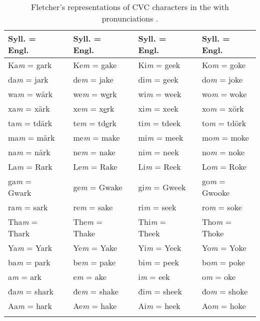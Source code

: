 \documentclass[output=paper]{LSP/langsci}
\begin{document}
\begin{table}
\begin{tabular}{lllllll}
\lsptoprule
Syll. = Engl. && Syll. = Engl. && Syll. = Engl. && Syll. = Engl.\\
\midrule
Ka\emph{m} = gark && Ke\emph{m} = gake && Ki\emph{m} = geek && Ko\emph{m} = goke\\
da\emph{m} = jark && de\emph{m} = jake && di\emph{m} = geek && do\emph{m} = joke\\
wa\emph{m} = wärk && we\emph{m} = w\underline{e}rk && wi\emph{m} = week && wo\emph{m} = woke\\
xa\emph{m} = xärk && xe\emph{m} = x\underline{e}rk && xi\emph{m} = xeek && xo\emph{m} = xörk\\
ta\emph{m} = tdärk && te\emph{m} = td\underline{e}rk && ti\emph{m} = tdeek && to\emph{m} = tdörk\\
ma\emph{m} = märk && me\emph{m} = make && mi\emph{m} = meek && mo\emph{m} = moke\\
na\emph{m} = närk && ne\emph{m} = nake && ni\emph{m} = neek && no\emph{m} = noke\\
La\emph{m} = Rark && Le\emph{m} = Rake && Li\emph{m} = Reek && Lo\emph{m} = Roke\\
ga\emph{m} = Gwark && ge\emph{m} = Gwake && gi\emph{m} = Gweek && go\emph{m} = Gwooke\\
ra\emph{m} = sark && re\emph{m} = sake && ri\emph{m} = seek && ro\emph{m} = soke\\
Tha\emph{m} = Thark && The\emph{m} = Thake && Thi\emph{m} = Theek && Tho\emph{m} = Thoke\\
Ya\emph{m} = Yark && Ye\emph{m} = Yake && Yi\emph{m} = Yeek && Yo\emph{m} = Yoke\\
ba\emph{m} = park && be\emph{m} = pake && bi\emph{m} = peek && bo\emph{m} = poke\\
a\emph{m} = ark && e\emph{m} = ake && i\emph{m} = eek && o\emph{m} = oke\\
đa\emph{m} = shark && đe\emph{m} = shake && đi\emph{m} = sheek && đo\emph{m} = shoke\\
Aa\emph{m} = hark && Ae\emph{m} = hake && Ai\emph{m} = heek && Ao\emph{m} = hoke\\
\lspbottomrule
\end{tabular}
\caption{Fletcher's representations of CVC characters in the   with  pronunciations \citep[adapted from][300]{Fletcher1890a}.}
\label{fletchercvc}
\end{table}
\end{document}
